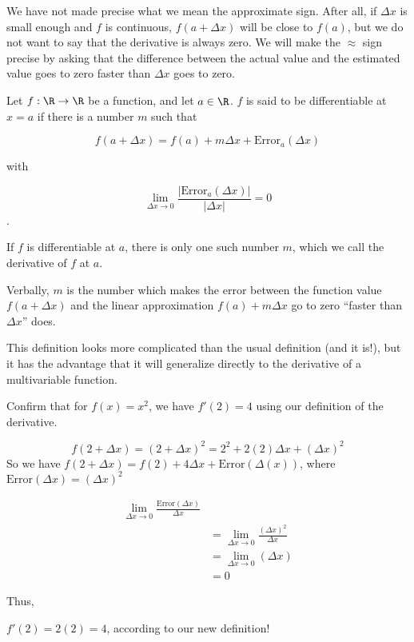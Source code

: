 \documentclass{ximera}
\begin{document}
We have not made precise what we mean the approximate sign.  After all, if $\Delta x$ is small enough and $f$ is continuous, 
$f(a+\Delta x)$ will be close to $f(a)$, but we do not want to say that the derivative is always zero.  We will make the  $\approx$ sign precise by asking that the difference 
between the actual value and the estimated value goes to zero faster than $\Delta x$ goes to zero.

\begin{definition}
  Let $f: \R \to \R$ be a function, and let $a \in \R$.  $f$ is said to be differentiable at $x=a$ if there is a number $m$ such that 
  
  \[ f(a+\Delta x) = f(a) + m\Delta x + \text{Error}_a(\Delta x)\]
  
  with
  
  \[ \lim_{\Delta x \to 0} \frac{\left|\text{Error}_a(\Delta x)\right|}{\left|\Delta x\right|} = 0 \].
  
  If $f$ is differentiable at $a$, there is only one such number $m$, which we call the derivative of $f$ at $a$.  
  
  Verbally,  $m$ is the number which makes the error between the function value $f(a+\Delta x)$ and the linear approximation $f(a)+m\Delta x$ go to zero 
  ``faster than $\Delta x$'' does.
\end{definition}

This definition looks more complicated than the usual definition (and it is!), but it has the advantage that it will 
generalize directly to the derivative of a multivariable function.
	

Confirm that for $f(x)=x^2$, we have $f'(2)=4$ using our definition of the derivative.
	
\begin{free-response}
  \[
  f(2+\Delta x) = (2+\Delta x)^2 = 2^2+2(2)\Delta x + (\Delta x)^2
  \]
  So we have $f(2+\Delta x) = f(2)+4\Delta x + \text{Error}(\Delta(x))$, where $\text{Error}(\Delta x) = (\Delta x)^2$
  
  \begin{align*}
    \lim_{\Delta x \to 0} \frac{\text{Error}(\Delta x)}{\Delta x}\\
    &=\lim_{\Delta x \to 0} \frac{(\Delta x)^2}{\Delta x} \\
    &= \lim_{\Delta x \to 0} \left(\Delta x  \right)\\
    &= 0
  \end{align*}
  
  Thus, 
  
  $f'(2) = 2(2) =4$, according to our new definition!
\end{free-response}
\end{document}
